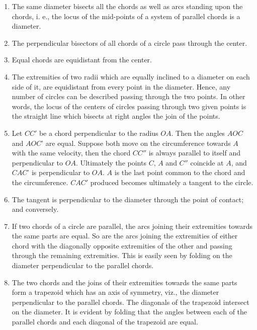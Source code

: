\begin{enumerate}
\item The same diameter bisects all the chords as well as arcs standing upon the
    chords, i. e., the locus of the mid-points of a system of parallel chords is
    a diameter.

\item The perpendicular bisectors of all chords of a circle pass through the
    center.

\item Equal chords are equidistant from the center.

\item The extremities of two radii which are equally inclined to a diameter on
    each side of it, are equidistant from every point in the diameter.  Hence,
    any number of circles can be described passing through the two points. In
    other words, the locus of the centers of circles passing through two given
    points is the straight line which bisects at right angles the join of the
    points.

\item Let $CC'$ be a chord perpendicular to the radius $OA$.  Then the angles
    $AOC$ and $AOC$' are equal.  Suppose both move on the circumference towards
    $A$ with the same velocity, then the chord $CC''$ is always parallel to
    itself and perpendicular to $OA$.  Ultimately the points $C$, $A$ and $C''$
    coincide at $A$, and $CAC$' is perpendicular to $OA$.  $A$ is the last point
    common to the chord and the circumference.  $CAC'$ produced becomes
    ultimately a tangent to the circle.

\item The tangent is perpendicular to the diameter through the point of contact;
    and conversely.


\item If two chords of a circle are parallel, the arcs joining their extremities
    towards the same parts are equal. So are the arcs joining the extremities of
    either chord with the diagonally opposite extremities of the other and
    passing through the remaining extremities.  This is easily seen by folding
    on the diameter perpendicular to the parallel chords.

\item The two chords and the joins of their extremities towards the same parts
    form a trapezoid which has an axis of symmetry, viz., the diameter
    perpendicular to the parallel chords. The diagonals of the trapezoid
    intersect on the diameter. It is evident by folding that the angles between
    each of the parallel chords and each diagonal of the trapezoid are equal.


\end{enumerate}
